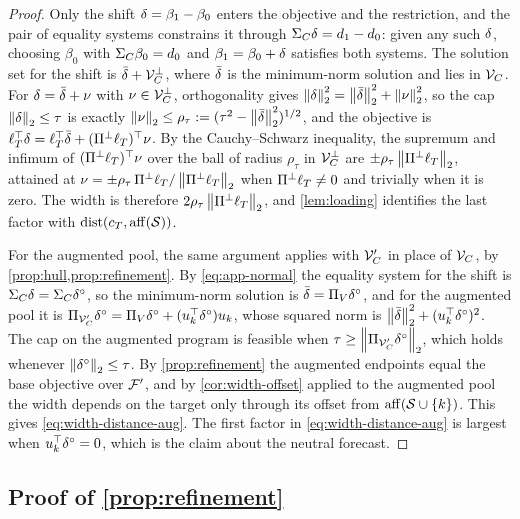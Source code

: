 \begin{proof}
Only the shift $\delta=\beta_1-\beta_0$ enters the objective and the
restriction, and the pair of equality systems constrains it through
$\Sigma_C\delta=d_{1}-d_{0}$: given any such $\delta$, choosing
$\beta_0$ with $\Sigma_C\beta_0=d_{0}$ and $\beta_1=\beta_0+\delta$
satisfies both systems. The solution set for the shift is
$\bar{\delta}+\mathcal V_C^\perp$, where $\bar{\delta}$ is the minimum-norm
solution and lies in $\mathcal V_C$. For $\delta=\bar{\delta}+\nu$ with
$\nu\in\mathcal V_C^\perp$, orthogonality gives
$\left\|{\delta}\right\|_2^2=\left\|{\bar{\delta}}\right\|_2^2+\left\|{\nu}\right\|_2^2$, so the cap
$\left\|{\delta}\right\|_2\leq\tau$ is exactly
$\left\|{\nu}\right\|_2\leq\rho_\tau:=(\tau^2-\left\|{\bar{\delta}}\right\|_2^2)^{1/2}$, and
the objective is
$\ell_T^\top\delta=\ell_T^\top\bar{\delta}+(\Pi^\perp\ell_T)^\top\nu$.
By the Cauchy--Schwarz inequality, the supremum and infimum of
$(\Pi^\perp\ell_T)^\top\nu$ over the ball of radius $\rho_\tau$ in
$\mathcal V_C^\perp$ are $\pm\rho_\tau\left\|{\Pi^\perp\ell_T}\right\|_2$, attained at
$\nu=\pm\rho_\tau\,\Pi^\perp\ell_T/\left\|{\Pi^\perp\ell_T}\right\|_2$ when
$\Pi^\perp\ell_T\neq0$ and trivially when it is zero. The width is
therefore $2\rho_\tau\left\|{\Pi^\perp\ell_T}\right\|_2$, and
\cref{lem:loading} identifies the last factor with
$\operatorname{dist}(c_T,\operatorname{aff}(\mathcal S))$.

For the augmented pool, the same argument applies with $\mathcal V_C'$ in place
of $\mathcal V_C$, by \cref{prop:hull,prop:refinement}. By \eqref{eq:app-normal}
the equality system for the shift is
$\Sigma_C\delta=\Sigma_C\delta^\circ$, so the minimum-norm solution is
$\bar{\delta}=\Pi_V\delta^\circ$, and for the augmented pool it is
$\Pi_{\mathcal V_C'}\delta^\circ=\Pi_V\delta^\circ
+(u_{k}^\top\delta^\circ)u_{k}$, whose squared norm is
$\left\|{\bar{\delta}}\right\|_2^2+(u_{k}^\top\delta^\circ)^2$. The cap on the
augmented program is feasible when $\tau\geq\left\|{\Pi_{\mathcal V_C'}\delta^\circ}\right\|_2$,
which holds whenever $\left\|{\delta^\circ}\right\|_2\leq\tau$. By
\cref{prop:refinement} the augmented endpoints equal the base objective
over $\mathcal F'$, and by \cref{cor:width-offset} applied to the augmented
pool the width depends on the target only through its offset from
$\operatorname{aff}(\mathcal S\cup\{k\})$. This gives \eqref{eq:width-distance-aug}.
The first factor in \eqref{eq:width-distance-aug} is largest when
$u_{k}^\top\delta^\circ=0$, which is the claim about the neutral
forecast.
\end{proof}

\subsection{Proof of \texorpdfstring{\cref{prop:refinement}}{Proposition 4}}
\label{app:proof-refinement}


